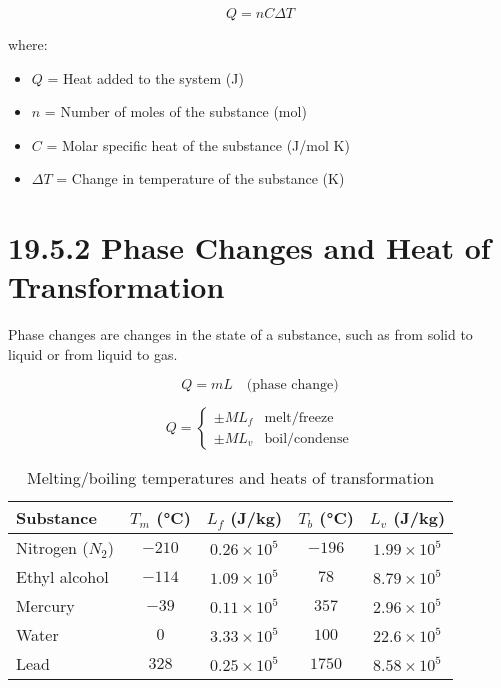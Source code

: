 \documentclass{article}
\begin{document}
\vspace{2cm}

\begin{equation}
    Q = nC \Delta T
\end{equation}

where:
\begin{itemize}
    \item $Q$ = Heat added to the system (J)
    \item $n$ = Number of moles of the substance (mol)
    \item $C$ = Molar specific heat of the substance (J/mol K)
    \item $\Delta T$ = Change in temperature of the substance (K)
\end{itemize}


\section*{19.5.2 Phase Changes and Heat of Transformation}

Phase changes are changes in the state of a substance, such as from solid to liquid or from liquid to gas.

\begin{tcolorbox}
    \begin{equation}
        Q = mL \quad \text{(phase change)}
    \end{equation}
\end{tcolorbox}

\quad

\begin{tcolorbox}
    \begin{equation}
        Q =
        \begin{cases} 
          \pm M L_f & \text{melt/freeze} \\
          \pm M L_v & \text{boil/condense}
        \end{cases}
    \end{equation}
\end{tcolorbox}

\quad


\begin{table}[h]
    \centering
    \caption{Melting/boiling temperatures and heats of transformation}
    \begin{tabular}{l c c c c}
        \toprule
        \textbf{Substance} & $T_m$ (°C) & $L_f$ (J/kg) & $T_b$ (°C) & $L_v$ (J/kg) \\
        \midrule
        Nitrogen ($N_2$) & $-210$ & $0.26 \times 10^5$ & $-196$ & $1.99 \times 10^5$ \\
        Ethyl alcohol & $-114$ & $1.09 \times 10^5$ & $78$ & $8.79 \times 10^5$ \\
        Mercury & $-39$ & $0.11 \times 10^5$ & $357$ & $2.96 \times 10^5$ \\
        Water & $0$ & $3.33 \times 10^5$ & $100$ & $22.6 \times 10^5$ \\
        Lead & $328$ & $0.25 \times 10^5$ & $1750$ & $8.58 \times 10^5$ \\
        \bottomrule
    \end{tabular}
\end{table}
\end{document}
